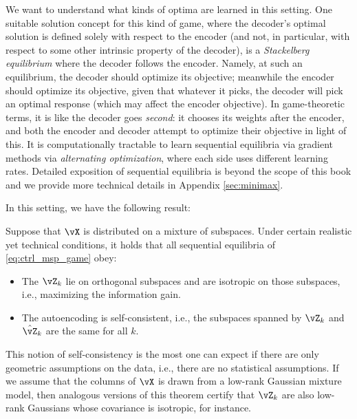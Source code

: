 \documentclass[../../book-main.tex]{subfiles}
\begin{document}
We want to understand what kinds of optima are learned in this setting. One suitable solution concept for this kind of game, where the decoder's optimal solution is defined solely with respect to the encoder (and not, in particular, with respect to some other intrinsic property of the decoder), is a \textit{Stackelberg equilibrium} where the decoder follows the encoder. %
Namely, at such an equilibrium, the decoder should optimize its objective; meanwhile the encoder should optimize its objective, given that whatever it picks, the decoder will pick an optimal response (which may affect the encoder objective). In game-theoretic terms, it is like the decoder goes \textit{second}: it chooses its weights after the encoder, and both the encoder and decoder attempt to optimize their objective in light of this. It is computationally tractable to learn sequential equilibria via gradient methods via \textit{alternating optimization}, where each side uses different learning rates. Detailed exposition of sequential equilibria is beyond the scope of this book and we provide more technical details in Appendix \ref{sec:minimax}. 

In this setting, we have the following result:
\begin{theorem}\label{thm:ctrl_theory}
    Suppose that \(\vX\) is distributed on a mixture of subspaces. Under certain realistic yet technical conditions, it holds that all sequential equilibria of \eqref{eq:ctrl_msp_game} obey:
    \begin{itemize}
        \item The \(\vZ_{k}\) lie on orthogonal subspaces and are isotropic on those subspaces, i.e., maximizing the information gain.
        \item The autoencoding is self-consistent, i.e., the subspaces spanned by \(\vZ_{k}\) and \(\hat{\vZ}_{k}\) are the same for all \(k\).
    \end{itemize}
\end{theorem}
This notion of self-consistency is the most one can expect if there are only geometric assumptions on the data, i.e., there are no statistical assumptions. If we assume that the columns of \(\vX\) is drawn from a low-rank Gaussian mixture model, then analogous versions of this theorem certify that \(\vZ_{k}\) are also low-rank Gaussians whose covariance is isotropic, for instance. %
\end{document}
